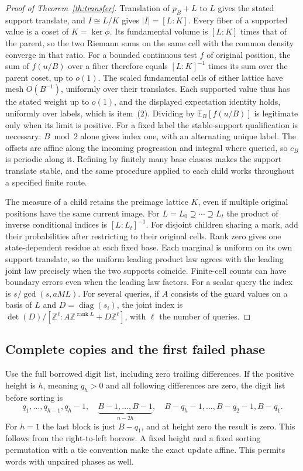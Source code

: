 \documentclass[11pt,reqno]{amsart}
\theoremstyle{definition}
\newcommand{\Z}{\mathbb Z}
\begin{document}
\begin{proof}[Proof of Theorem~\ref{th:transfer}]
Translation of \(p_B+L\) to \(L\) gives the stated support translate, and \(I\cong L/K\) gives \(|I|=[L:K]\). Every fiber of a supported value is a coset of \(K=\ker\phi\). Its fundamental volume is \([L:K]\) times that of the parent, so the two Riemann sums on the same cell with the common density converge in that ratio. For a bounded continuous test \(f\) of original position, the sum of \(f(u/B)\) over a fiber therefore equals \([L:K]^{-1}\) times its sum over the parent coset, up to \(o(1)\). The scaled fundamental cells of either lattice have mesh \(O(B^{-1})\), uniformly over their translates. Each supported value thus has the stated weight up to \(o(1)\), and the displayed expectation identity holds, uniformly over labels, which is item~(2). Dividing by \(\mathbb E_B[f(u/B)]\) is legitimate only when its limit is positive. For a fixed label the stable-support qualification is necessary: \(B\bmod 2\) alone gives index one, with an alternating unique label. The offsets are affine along the incoming progression and integral where queried, so \(c_B\) is periodic along it. Refining by finitely many base classes makes the support translate stable, and the same procedure applied to each child works throughout a specified finite route.

The measure of a child retains the preimage lattice \(K\), even if multiple original positions have the same current image. For \(L=L_0\supseteq\cdots\supseteq L_t\) the product of inverse conditional indices is \([L:L_t]^{-1}\). For disjoint children sharing a mark, add their probabilities after restricting to their original cells. Rank zero gives one state-dependent residue at each fixed base. Each marginal is uniform on its own support translate, so the uniform leading product law agrees with the leading joint law precisely when the two supports coincide. Finite-cell counts can have boundary errors even when the leading law factors. For a scalar query the index is \(s/\gcd(s,aML)\). For several queries, if \(A\) consists of the guard values on a basis of \(L\) and \(D=\operatorname{diag}(s_i)\), the joint index is \(\det(D)/[\Z^\ell:A\Z^{\operatorname{rank}L}+D\Z^\ell]\), with \(\ell\) the number of queries.
\end{proof}

\subsection{Complete copies and the first failed phase}
Use the full borrowed digit list, including zero trailing differences. If the positive height is \(h\), meaning \(q_h>0\) and all following differences are zero, the digit list before sorting is
\[
 q_1,\ldots,q_{h-1},q_h-1,\quad
 \underbrace{B-1,\ldots,B-1}_{n-2h},\quad
 B-q_h-1,\ldots,B-q_2-1,B-q_1 .
\]
For \(h=1\) the last block is just \(B-q_1\), and at height zero the result is zero. This follows from the right-to-left borrow. A fixed height and a fixed sorting permutation with a tie convention make the exact update affine. This permits words with unpaired phases as well.
\end{document}
